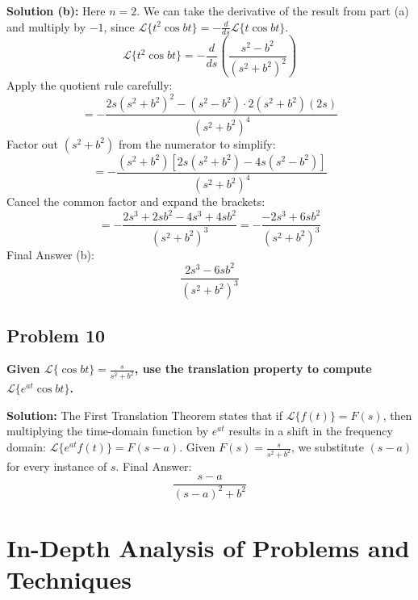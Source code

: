 \documentclass[11pt, a4paper]{article}
\theoremstyle{definition}
\theoremstyle{remark}
\begin{document}
\textbf{Solution (b):}
Here $n=2$. We can take the derivative of the result from part (a) and multiply by $-1$, since $\mathscr{L}\{t^2 \cos bt\} = -\frac{d}{ds} \mathscr{L}\{t \cos bt\}$.
\[
\mathscr{L}\{t^2 \cos bt\} = - \frac{d}{ds} \left( \frac{s^2 - b^2}{(s^2 + b^2)^2} \right)
\]
Apply the quotient rule carefully:
\[
= - \frac{2s(s^2 + b^2)^2 - (s^2 - b^2) \cdot 2(s^2 + b^2)(2s)}{(s^2 + b^2)^4}
\]
Factor out $(s^2 + b^2)$ from the numerator to simplify:
\[
= - \frac{(s^2 + b^2) [ 2s(s^2 + b^2) - 4s(s^2 - b^2) ]}{(s^2 + b^2)^4}
\]
Cancel the common factor and expand the brackets:
\[
= - \frac{2s^3 + 2sb^2 - 4s^3 + 4sb^2}{(s^2 + b^2)^3} = - \frac{-2s^3 + 6sb^2}{(s^2 + b^2)^3}
\]
Final Answer (b):
\[
\frac{2s^3 - 6sb^2}{(s^2 + b^2)^3}
\]

\subsection{Problem 10}
\textbf{Given $\mathscr{L}\{\cos bt\} = \frac{s}{s^2 + b^2}$, use the translation property to compute $\mathscr{L}\{e^{at} \cos bt\}$.}

\textbf{Solution:}
The First Translation Theorem states that if $\mathscr{L}\{f(t)\} = F(s)$, then multiplying the time-domain function by $e^{at}$ results in a shift in the frequency domain: $\mathscr{L}\{e^{at} f(t)\} = F(s-a)$.
Given $F(s) = \frac{s}{s^2 + b^2}$, we substitute $(s-a)$ for every instance of $s$.
Final Answer:
\[
\frac{s-a}{(s-a)^2 + b^2}
\]

\newpage

\section{In-Depth Analysis of Problems and Techniques}
\end{document}
